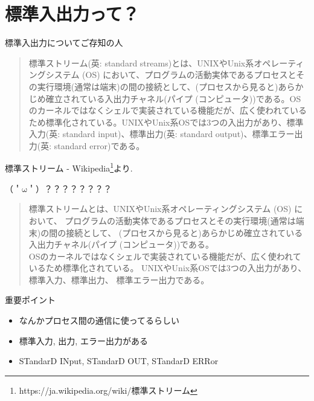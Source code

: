 \documentclass[uplatex, dvipdfmx, unicode]{beamer}
\begin{document}
\section{標準入出力って？}
\begin{frame}
  \centering
  \Huge{標準入出力についてご存知の人\faHandPaperO}
\end{frame}

\begin{frame}
  \begin{quote}
    標準ストリーム(英: standard streams)とは、UNIXやUnix系オペレーティングシステム (OS) において、プログラムの活動実体であるプロセスとその実行環境(通常は端末)の間の接続として、(プロセスから見ると)あらかじめ確立されている入出力チャネル(パイプ (コンピュータ))である。OSのカーネルではなくシェルで実装されている機能だが、広く使われているため標準化されている。UNIXやUnix系OSでは3つの入出力があり、標準入力(英: standard input)、標準出力(英: standard output)、標準エラー出力(英: standard error)である。
  \end{quote}
  \small{標準ストリーム - Wikipedia\footnote{https://ja.wikipedia.org/wiki/標準ストリーム}より.}
\end{frame}

\begin{frame}
  \centering
  \Huge{（＇$\mathrm{\omega}$＇）？？？？？？？？}
\end{frame}

\begin{frame}
  \begin{quote}
    標準ストリームとは、UNIXやUnix系オペレーティングシステム (OS) において、
    \alert{プログラムの活動実体であるプロセスとその実行環境(通常は端末)の間の接続}として、
    (プロセスから見ると)あらかじめ確立されている\alert{入出力チャネル}(パイプ (コンピュータ))である。 \\
    OSのカーネルではなくシェルで実装されている機能だが、広く使われているため標準化されている。
    UNIXやUnix系OSでは3つの入出力があり、\alert{標準入力、標準出力、
    標準エラー出力}である。
  \end{quote}
\end{frame}

\begin{frame}{重要ポイント}
  \begin{itemize}
    \item{なんかプロセス間の通信に使ってるらしい}
    \item{標準入力, 出力, エラー出力がある}
    \item{\alert{ST}andar\alert{D} \alert{IN}put, \alert{ST}andar\alert{D} \alert{OUT},
      \alert{ST}andar\alert{D} \alert{ERR}or}
  \end{itemize}
\end{frame}
\end{document}
